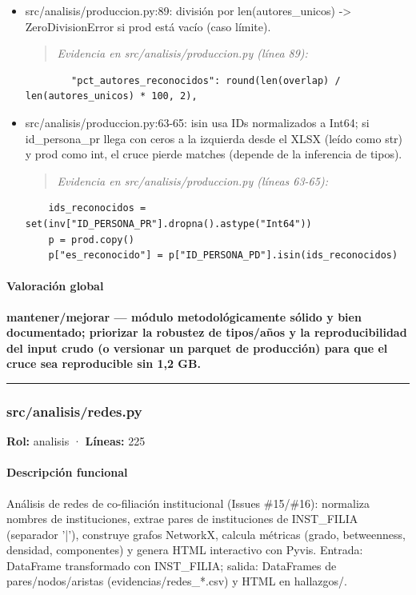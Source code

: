 \begin{tcolorbox}[riesgo]
\begin{itemize}
  \item src/analisis/produccion.py:89: división por len(autores\_unicos) -> ZeroDivisionError si prod está vacío (caso límite).
\begin{quote}\footnotesize\ttfamily
\noindent\emph{Evidencia en src/analisis/produccion.py (línea 89):}
\end{quote}
\begin{lstlisting}
        "pct_autores_reconocidos": round(len(overlap) / len(autores_unicos) * 100, 2),
\end{lstlisting}

  \item src/analisis/produccion.py:63-65: isin usa IDs normalizados a Int64; si id\_persona\_pr llega con ceros a la izquierda desde el XLSX (leído como str) y prod como int, el cruce pierde matches (depende de la inferencia de tipos).
\begin{quote}\footnotesize\ttfamily
\noindent\emph{Evidencia en src/analisis/produccion.py (líneas 63-65):}
\end{quote}
\begin{lstlisting}
    ids_reconocidos = set(inv["ID_PERSONA_PR"].dropna().astype("Int64"))
    p = prod.copy()
    p["es_reconocido"] = p["ID_PERSONA_PD"].isin(ids_reconocidos)
\end{lstlisting}

\end{itemize}
\end{tcolorbox}

\paragraph{Valoración global}
\textbf{mantener/mejorar --- módulo metodológicamente sólido y bien documentado; priorizar la robustez de tipos/años y la reproducibilidad del input crudo (o versionar un parquet de producción) para que el cruce sea reproducible sin 1,2 GB.}

\medskip
\hrule

\subsubsection{src/analisis/redes.py}
\textbf{Rol:} analisis · \textbf{Líneas:} 225

\paragraph{Descripción funcional}
Análisis de redes de co-filiación institucional (Issues \#15/\#16): normaliza nombres de instituciones, extrae pares de instituciones de INST\_FILIA (separador '|'), construye grafos NetworkX, calcula métricas (grado, betweenness, densidad, componentes) y genera HTML interactivo con Pyvis. Entrada: DataFrame transformado con INST\_FILIA; salida: DataFrames de pares/nodos/aristas (evidencias/redes\_*.csv) y HTML en hallazgos/.

